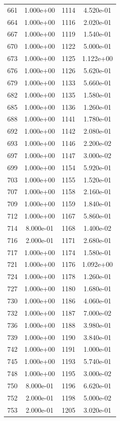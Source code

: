 \documentclass[12pt]{article}
\begin{document}
\begin{longtable}{@{}cccc@{}}
661 & 1.000e+00 & 1114 & 4.520e-01 \\
664 & 1.000e+00 & 1116 & 2.020e-01 \\
667 & 1.000e+00 & 1119 & 1.540e-01 \\
670 & 1.000e+00 & 1122 & 5.000e-01 \\
673 & 1.000e+00 & 1125 & 1.122e+00 \\
676 & 1.000e+00 & 1126 & 5.620e-01 \\
679 & 1.000e+00 & 1133 & 5.660e-01 \\
682 & 1.000e+00 & 1135 & 1.580e-01 \\
685 & 1.000e+00 & 1136 & 1.260e-01 \\
688 & 1.000e+00 & 1141 & 1.780e-01 \\
692 & 1.000e+00 & 1142 & 2.080e-01 \\
693 & 1.000e+00 & 1146 & 2.200e-02 \\
697 & 1.000e+00 & 1147 & 3.000e-02 \\
699 & 1.000e+00 & 1154 & 5.920e-01 \\
703 & 1.000e+00 & 1155 & 1.520e-01 \\
707 & 1.000e+00 & 1158 & 2.160e-01 \\
709 & 1.000e+00 & 1159 & 1.840e-01 \\
712 & 1.000e+00 & 1167 & 5.860e-01 \\
714 & 8.000e-01 & 1168 & 1.400e-02 \\
716 & 2.000e-01 & 1171 & 2.680e-01 \\
717 & 1.000e+00 & 1174 & 1.580e-01 \\
721 & 1.000e+00 & 1176 & 1.092e+00 \\
724 & 1.000e+00 & 1178 & 1.260e-01 \\
727 & 1.000e+00 & 1180 & 1.680e-01 \\
730 & 1.000e+00 & 1186 & 4.060e-01 \\
732 & 1.000e+00 & 1187 & 7.000e-02 \\
736 & 1.000e+00 & 1188 & 3.980e-01 \\
739 & 1.000e+00 & 1190 & 3.840e-01 \\
742 & 1.000e+00 & 1191 & 1.000e-01 \\
745 & 1.000e+00 & 1193 & 5.740e-01 \\
748 & 1.000e+00 & 1195 & 3.000e-02 \\
750 & 8.000e-01 & 1196 & 6.620e-01 \\
752 & 2.000e-01 & 1198 & 5.000e-02 \\
753 & 2.000e-01 & 1205 & 3.020e-01 \\

\end{longtable}
\end{document}
